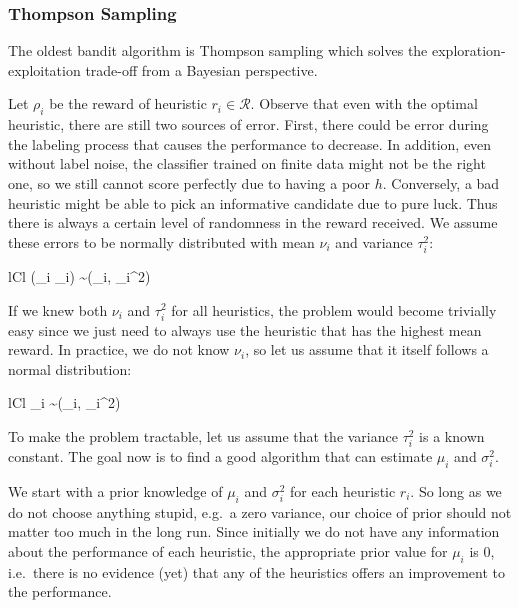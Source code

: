 \documentclass[fleqn,10pt,lineno]{wlpeerj} %
\newcommand{\Normal}{\mathcal{N}}
\newcommand{\R}{\mathcal{R}}
\begin{document}
\subsubsection{Thompson Sampling}

The oldest bandit algorithm is Thompson sampling \citep{thompson33} which
solves the exploration-exploitation trade-off from a Bayesian perspective.

Let $\rho_i$ be the reward of heuristic $r_i \in \R$. Observe
that even with the optimal heuristic, there are still two sources of error.
First, there could be error during the labeling process that causes the
performance to decrease. In addition, even without label noise, the classifier
trained on finite data might not be the right one, so we still cannot score
perfectly due to having a poor $h$. Conversely, a bad heuristic might be able
to pick an informative candidate due to pure luck. Thus there is always a
certain level of randomness in the reward received. We assume these errors to
be normally distributed with mean $\nu_i$ and variance $\tau_i^2$:
	\begin{IEEEeqnarray}{lCl}
		(\rho_i \mid \nu_i) \sim \Normal(\nu_i, \tau_i^2)
	\end{IEEEeqnarray}

If we knew both $\nu_i$ and $\tau_i^2$ for all heuristics, the problem would
become trivially easy since we just need to always use the heuristic that has
the highest mean reward. In practice, we do not know $\nu_i$, so let us assume
that it itself follows a normal distribution:
	\begin{IEEEeqnarray}{lCl}
        \nu_i \sim \Normal(\mu_i, \sigma_i^2)
    \end{IEEEeqnarray}

To make the problem tractable, let us assume that the variance $\tau_i^2$ is a
known constant. The goal now is to find a good algorithm that can estimate
$\mu_i$ and $\sigma_i^2$.

We start with a prior knowledge of $\mu_i$ and $\sigma_i^2$ for each heuristic
$r_i$. So long as we do not choose anything stupid, e.g.\ a zero variance, our
choice of prior should not matter too much in the long run. Since initially we
do not have any information about the performance of each heuristic, the
appropriate prior value for $\mu_i$ is $0$, i.e.\ there is no evidence (yet)
that any of the heuristics offers an improvement to the performance.
\end{document}
